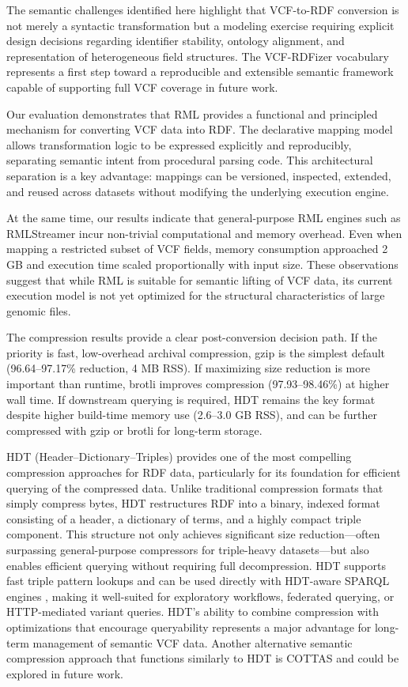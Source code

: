 \documentclass[unnumsec,webpdf,contemporary,large]{oup-authoring-template}
\begin{document}
The semantic challenges identified here highlight that VCF-to-RDF conversion is not merely a syntactic transformation but a modeling exercise requiring explicit design decisions regarding identifier stability, ontology alignment, and representation of heterogeneous field structures. 
The VCF-RDFizer vocabulary represents a first step toward a reproducible and extensible semantic framework capable of supporting full VCF coverage in future work.

Our evaluation demonstrates that RML provides a functional and principled mechanism for converting VCF data into RDF. 
The declarative mapping model allows transformation logic to be expressed explicitly and reproducibly, separating semantic intent from procedural parsing code. 
This architectural separation is a key advantage: mappings can be versioned, inspected, extended, and reused across datasets without modifying the underlying execution engine.

At the same time, our results indicate that general-purpose RML engines such as RMLStreamer incur non-trivial computational and memory overhead. 
Even when mapping a restricted subset of VCF fields, memory consumption approached 2 GB and execution time scaled proportionally with input size. 
These observations suggest that while RML is suitable for semantic lifting of VCF data, its current execution model is not yet optimized for the structural characteristics of large genomic files.

The compression results provide a clear post-conversion decision path. If the priority is fast, low-overhead archival compression, gzip is the simplest default (96.64--97.17\% reduction, 4 MB RSS). If maximizing size reduction is more important than runtime, brotli improves compression (97.93--98.46\%) at higher wall time. If downstream querying is required, HDT remains the key format despite higher build-time memory use (2.6--3.0 GB RSS), and can be further compressed with gzip or brotli for long-term storage.

HDT (Header–Dictionary–Triples) provides one of the most compelling compression approaches for RDF data, particularly for its foundation for efficient querying of the compressed data. 
Unlike traditional compression formats that simply compress bytes, HDT restructures RDF into a binary, indexed format consisting of a header, a dictionary of terms, and a highly compact triple component. 
This structure not only achieves significant size reduction—often surpassing general-purpose compressors for triple-heavy datasets—but also enables efficient querying without requiring full decompression. 
HDT supports fast triple pattern lookups and can be used directly with HDT-aware SPARQL engines \cite{Taelman2018Comunica}, making it well-suited for exploratory workflows, federated querying, or HTTP-mediated variant queries. 
HDT's ability to combine compression with optimizations that encourage queryability represents a major advantage for long-term management of semantic VCF data.
Another alternative semantic compression approach that functions similarly to HDT is COTTAS \cite{cottas_2025} and could be explored in future work.
\end{document}
